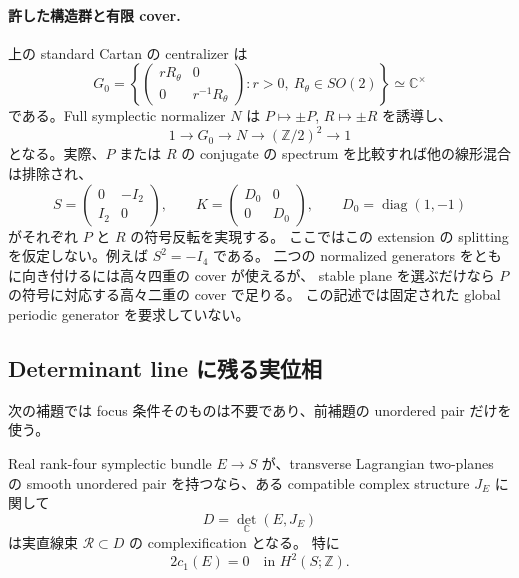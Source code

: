 \paragraph{許した構造群と有限 cover.}
上の standard Cartan の centralizer は
\[
 G_0=\left\{
 \begin{pmatrix}rR_\theta&0\\0&r^{-1}R_\theta\end{pmatrix}
 :r>0,\ R_\theta\in SO(2)\right\}
 \simeq\mathbb C^\times
\]
である。Full symplectic normalizer $N$ は $P\mapsto\pm P$, $R\mapsto\pm R$ を誘導し、
\[
 1\longrightarrow G_0\longrightarrow N
 \longrightarrow(\mathbb Z/2)^2\longrightarrow1
\]
となる。実際、$P$ または $R$ の conjugate の spectrum を比較すれば他の線形混合は排除され、
\[
 S=\begin{pmatrix}0&-I_2\\I_2&0\end{pmatrix},\qquad
 K=\begin{pmatrix}D_0&0\\0&D_0\end{pmatrix},\qquad
 D_0=\operatorname{diag}(1,-1)
\]
がそれぞれ $P$ と $R$ の符号反転を実現する。
ここではこの extension の splitting を仮定しない。例えば $S^2=-I_4$ である。
二つの normalized generators をともに向き付けるには高々四重の cover が使えるが、
stable plane を選ぶだけなら $P$ の符号に対応する高々二重の cover で足りる。
この記述では固定された global periodic generator を要求していない。

\subsection{Determinant line に残る実位相}

次の補題では focus 条件そのものは不要であり、前補題の unordered pair だけを使う。

\begin{lemma}\label{fnc:determinant-real}
Real rank-four symplectic bundle $E\to S$ が、transverse Lagrangian two-planes の
smooth unordered pair を持つなら、ある compatible complex structure $J_E$ に関して
\[
 D=\det_{\mathbb C}(E,J_E)
\]
は実直線束 $\mathcal R\subset D$ の complexification となる。
特に
\begin{equation}\label{fnc:chern-torsion}
 2c_1(E)=0\quad\text{in }H^2(S;\mathbb Z).
\end{equation}
\end{lemma}

